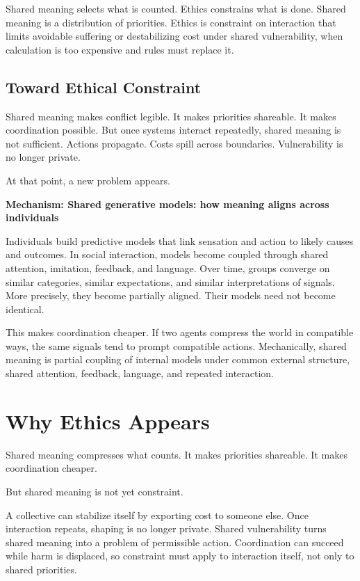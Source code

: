 \documentclass[11pt,twoside,openright]{book}
\newenvironment{mechanismbox}[1]
  {\begin{framed}\noindent\textbf{Mechanism: #1}\par\medskip}
  {\end{framed}}
\begin{document}
Shared meaning selects what is counted. Ethics constrains what is done. Shared meaning is a distribution of priorities. Ethics is constraint on interaction that limits avoidable suffering or destabilizing cost under shared vulnerability, when calculation is too expensive and rules must replace it.

\section*{Toward Ethical Constraint}

Shared meaning makes conflict legible. It makes priorities shareable. It makes coordination possible. But once systems interact repeatedly, shared meaning is not sufficient. Actions propagate. Costs spill across boundaries. Vulnerability is no longer private.

At that point, a new problem appears.

\begin{mechanismbox}{Shared generative models: how meaning aligns across individuals}

Individuals build predictive models that link sensation and action to likely causes and outcomes. In social interaction, models become coupled through shared attention, imitation, feedback, and language. Over time, groups converge on similar categories, similar expectations, and similar interpretations of signals. More precisely, they become partially aligned. Their models need not become identical.

This makes coordination cheaper. If two agents compress the world in compatible ways, the same signals tend to prompt compatible actions. Mechanically, shared meaning is partial coupling of internal models under common external structure, shared attention, feedback, language, and repeated interaction.

\end{mechanismbox}
\chapter{Why Ethics Appears}
\label{ch:ethics_appears}

Shared meaning compresses what counts. It makes priorities shareable. It makes coordination cheaper.

But shared meaning is not yet constraint.

A collective can stabilize itself by exporting cost to someone else. Once interaction repeats, shaping is no longer private. Shared vulnerability turns shared meaning into a problem of permissible action. Coordination can succeed while harm is displaced, so constraint must apply to interaction itself, not only to shared priorities.
\end{document}
